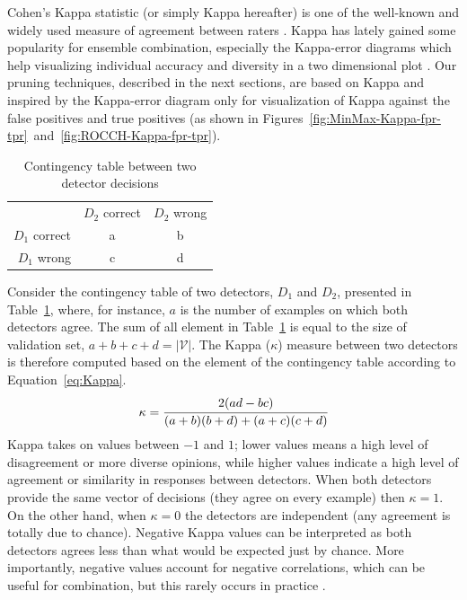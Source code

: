 Cohen's Kappa statistic (or simply Kappa hereafter) is one of the well-known and widely used measure of agreement between raters \cite{Cohen1995a}.
Kappa has lately gained some popularity for ensemble combination, especially the Kappa-error diagrams which help visualizing individual accuracy and diversity in a two dimensional plot \cite{Margineantu1997,Kunchev2013}.
Our pruning techniques, described in the next sections, are based on Kappa and inspired by the Kappa-error diagram only for visualization of Kappa against the false positives and true positives (as shown in Figures~\ref{fig:MinMax-Kappa-fpr-tpr}~and~\ref{fig:ROCCH-Kappa-fpr-tpr}).

\begin{table}[tbh]
    \normalsize
    \centering
    \renewcommand{\arraystretch}{1.3}
    \caption{Contingency table between two detector decisions}
    \label{Table::Contigency}
    \centering
    \begin{tabular}{ r|c|c| }
        \multicolumn{1}{r}{}
	 &  \multicolumn{1}{c}{$D_2$ correct}
	 & \multicolumn{1}{c}{$D_2$ wrong} \\
	\cline{2-3}
	$D_1$ correct & a & b \\
	\cline{2-3}
	$D_1$ wrong & c & d \\
	\cline{2-3}
    \end{tabular}
\end{table}

Consider the contingency table of two detectors, $D_1$ and $D_2$, presented in Table~\ref{Table::Contigency}, where, for instance, $a$ is the number of examples on which both detectors agree.
The sum of all element in Table~\ref{Table::Contigency} is equal to the size of validation set, $a+b+c+d=|\mathcal{V}|$.
The Kappa ($\kappa$) measure between two detectors is therefore computed based on the element of the contingency table according to Equation~\ref{eq:Kappa}.
\begin{equation}
  \kappa =  \cfrac{2(ad-bc)}{(a+b)(b+d) + (a+c)(c+d) }
  \label{eq:Kappa}
\end{equation}
Kappa takes on values between $-1$ and $1$; lower values means a high level of disagreement or more diverse opinions, while higher values indicate a high level of agreement or similarity in responses between detectors.
When both detectors provide the same vector of decisions (they agree on every example) then $\kappa=1$.
On the other hand, when $\kappa=0$ the detectors are independent (any agreement is totally due to chance).
Negative Kappa values can be interpreted as both detectors agrees less than what would be expected just by chance.
More importantly, negative values account for negative correlations, which can be useful for combination, but this rarely occurs in practice \cite{Margineantu1997}.  %


